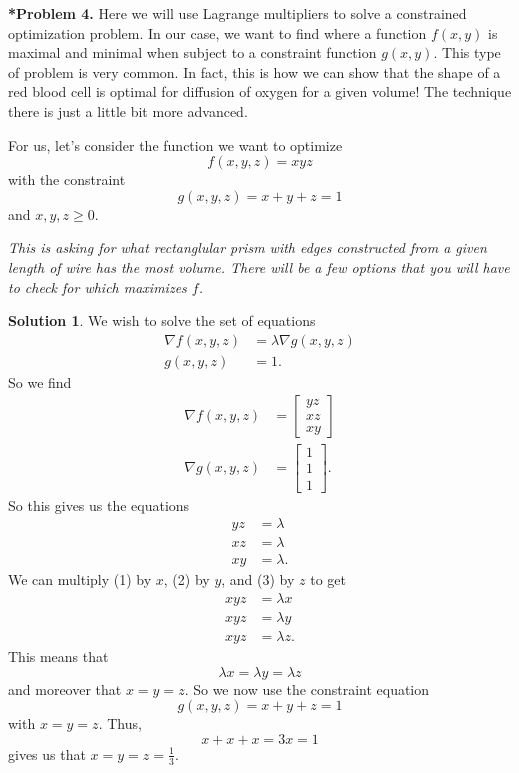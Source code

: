 \documentclass[12pt]{report} %
\theoremstyle{definition}
\newtheorem{solution}{Solution}
\begin{document}
\noindent\textbf{*Problem 4.} Here we will use Lagrange multipliers to solve a constrained optimization problem.  In our case, we want to find where a function $f(x,y)$ is maximal and minimal when subject to a constraint function $g(x,y)$.  This type of problem is very common.  In fact, this is how we can show that the shape of a red blood cell is optimal for diffusion of oxygen for a given volume! The technique there is just a little bit more advanced.

For us, let's consider the function we want to optimize
\[
f(x,y,z)=xyz
\]
with the constraint 
\[
g(x,y,z)=x+y+z=1
\]
and $x,y,z\geq 0$. 

\emph{This is asking for what rectanglular prism with edges constructed from a given length of wire has the most volume. There will be a few options that you will have to check for which maximizes $f$.}
\begin{solution}
We wish to solve the set of equations
\begin{align*}
    \nabla f(x,y,z) &= \lambda \nabla g(x,y,z)\\
    g(x,y,z) &= 1.
\end{align*}
So we find
\begin{align*}
    \nabla f(x,y,z) &= \begin{bmatrix} yz \\ xz \\ xy \end{bmatrix}\\
    \nabla g(x,y,z) &= \begin{bmatrix} 1 \\ 1 \\ 1 \end{bmatrix}.
\end{align*}
So this gives us the equations
\begin{align}
    yz &= \lambda \\
    xz &= \lambda \\
    xy &= \lambda.
\end{align}
We can multiply (1) by $x$, (2) by $y$, and (3) by $z$ to get
\begin{align*}
    xyz&=\lambda x\\
    xyz&=\lambda y\\
    xyz&= \lambda z.
\end{align*}
This means that
\[
\lambda x = \lambda y = \lambda z
\]
and moreover that $x=y=z$. So we now use the constraint equation
\[
g(x,y,z)=x+y+z=1
\]
with $x=y=z$. Thus,
\[
x+x+x=3x=1 
\]
gives us that $x=y=z=\frac{1}{3}$.

\end{solution}
\vspace*{.5cm}
\end{document}
